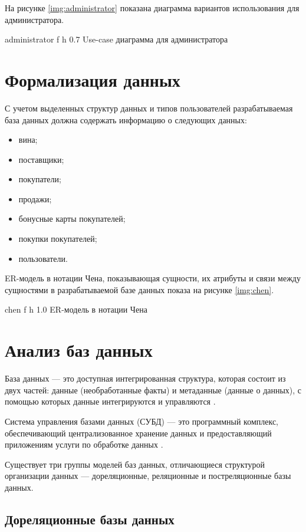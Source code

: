 На рисунке \ref{img:administrator} показана диаграмма вариантов использования для администратора.

    {administrator}
    {f}
    {h}
    {0.7\textwidth}
    {Use-case диаграмма для администратора}

\section{Формализация данных}

С учетом выделенных структур данных и типов пользователей разрабатываемая база данных должна содержать информацию о следующих данных:

\begin{itemize}
	\item вина;
	\item поставщики;
	\item покупатели;
	\item продажи;
	\item бонусные карты покупателей;
	\item покупки покупателей;
	\item пользователи.
\end{itemize}

ER-модель в нотации Чена, показывающая сущности, их атрибуты и связи между сущностями в разрабатываемой базе данных показа на рисунке \ref{img:chen}.

    {chen}
    {f}
    {h}
    {1.0\textwidth}
    {ER-модель в нотации Чена}

\section{Анализ баз данных}

База данных --- это доступная интегрированная структура, которая состоит из двух частей: данные (необработанные факты) и метаданные (данные о данных), с помощью которых данные интегрируются и управляются \cite{db}.

Система управления базами данных (СУБД) --- это программный комплекс, обеспечивающий централизованное хранение данных и предоставляющий приложениям услуги по обработке данных \cite{dms}.

Существует три группы моделей баз данных, отличающиеся структурой организации данных --- дореляционные, реляционные и постреляционные базы данных.

\subsection{Дореляционные базы данных}

